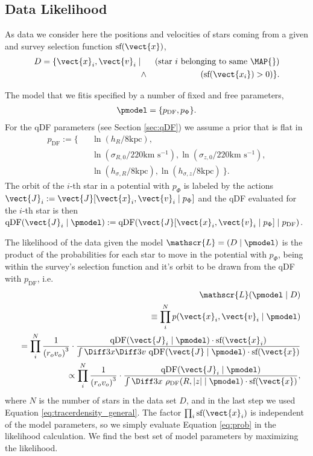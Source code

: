\subsection{Data Likelihood} \label{sec:likelihood}

As data we consider here the positions and velocities of stars coming from a given \MAP{} and survey selection function $\text{sf}(\vect{x})$,
\begin{eqnarray*}
D  =\{ \vect{x}_i,\vect{v}_i \mid && \text{(star $i$ belonging to same \MAP{})}\nonumber\\
&\wedge& (\text{sf}(\vect{x_i}) > 0) \}.
\end{eqnarray*}

The model that we fitis specified by a number of fixed and free parameters,
\begin{eqnarray*}
\pmodel =\{ p_\text{DF} , p_\Phi \}.
\end{eqnarray*}
For the qDF parameters (see Section \ref{sec:qDF}) we assume a prior that is flat in
\begin{eqnarray*}
p_\text{DF} := \{&& \ln \left(h_R/8\text{kpc}\right), \\
&& \ln \left(\sigma_{R,0}/220\text{km s$^{-1}$}\right), \ln \left(\sigma_{z,0}/220\text{km s$^{-1}$}\right), \\
&& \ln \left(h_{\sigma,R}/8\text{kpc}\right), \ln \left(h_{\sigma,z}/8\text{kpc}\right)\ \}.
\end{eqnarray*}
The orbit of the $i$-th star in a potential with $p_\Phi$ is labeled by the actions $\vect{J}_i := \vect{J}[\vect{x}_i,\vect{v}_i\mid p_{\Phi}]$ and the qDF evaluated for the $i$-th star is then $\text{qDF}(\vect{J}_i \mid \pmodel) := \text{qDF}(\vect{J}[\vect{x}_i,\vect{v}_i\mid p_{\Phi}] \mid p_\text{DF})$.

The likelihood of the data given the model $\mathscr{L} = (D \mid \pmodel)$ is the product of the probabilities for each star to move in the potential with $p_\Phi$, being within the survey's selection function and it's orbit to be drawn from the qDF with $p_\text{DF}$, i.e. 
\begin{eqnarray}
&&\mathscr{L}(\pmodel \mid D) \nonumber\\
&&\equiv \prod_i^{N} p(\vect{x}_i,\vect{v}_i \mid \pmodel) \nonumber\\
&&= \prod_i^{N} \frac{1}{\left(r_o v_o\right)^3} \cdot \frac{\text{qDF}(\vect{J}_i \mid \pmodel) \cdot \text{sf}(\vect{x}_i)}{\int \Diff 3 x \Diff 3 v \  \text{qDF}(\vect{J} \mid \pmodel) \cdot \text{sf}(\vect{x})}\nonumber\\
&&\propto \prod_i^{N} \frac{1}{\left(r_o v_o\right)^3} \cdot \frac{\text{qDF}(\vect{J}_i \mid \pmodel)}{\int \Diff 3 x \  \rho_\text{DF}(R,|z| \mid \pmodel) \cdot \text{sf}(\vect{x})}, \label{eq:prob}
\end{eqnarray}
where $N$ is the number of stars in the data set $D$, and in the last step we used Equation \ref{eq:tracerdensity_general}. The factor $\prod_i\text{sf}(\vect{x}_i)$ is independent of the model parameters, so we  simply evaluate Equation \ref{eq:prob} in the likelihood calculation. We find the best set of model parameters by maximizing the likelihood. 

